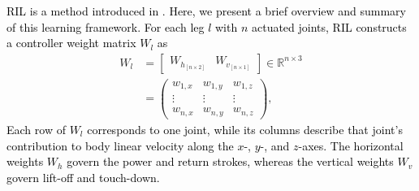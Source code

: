 \documentclass[a4paper, 10pt, conference]{ieeeconf}
\newcommand{\oldtext}[1]{\textcolor{red}{}}
\newcommand{\newtext}[1]{\textcolor{black}{#1}}
\begin{document}

\newtext{RIL is a method introduced in \cite{leung2023,ril}. Here, we present a brief overview and summary of this learning framework. For each leg $l$ with $n$ actuated joints, RIL constructs a controller weight matrix $W_l$ as}
{\color{black}
\begin{equation}
  \begin{aligned}
    W_l &= \begin{bmatrix} W_{h_{[n\times2]}} & W_{v_{[n\times1]}} \end{bmatrix}
        \in \mathbb{R}^{n\times 3}\\[2pt]
        &= \begin{pmatrix}
             w_{1,x} & w_{1,y} & w_{1,z}\\
             \vdots  & \vdots  & \vdots \\
             w_{n,x} & w_{n,y} & w_{n,z}
           \end{pmatrix},
  \end{aligned}
  \label{eq:wl}
\end{equation}}
\newtext{Each row of $W_l$ corresponds to one joint, while its columns describe
that joint's contribution to body linear velocity along the $x$-, $y$-, and
$z$-axes. The horizontal weights $W_h$ govern the power and return strokes,
whereas the vertical weights $W_v$ govern lift-off and touch-down.}
\end{document}
